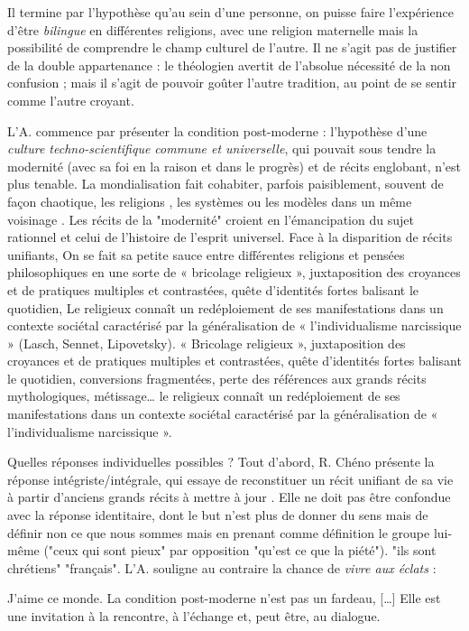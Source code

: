 Il termine par l'hypothèse qu'au sein d'une personne, on puisse faire l'expérience d'être \textit{bilingue} en différentes religions, avec une religion maternelle mais la possibilité de comprendre le champ culturel de l'autre.  Il ne s’agit pas de justifier de la double
appartenance : le théologien avertit de l’absolue nécessité de la non confusion ;
mais il s’agit de pouvoir goûter l’autre tradition, au point de se sentir comme
l’autre croyant. 

L'A. commence par présenter la condition post-moderne : l'hypothèse d'une \textit{culture techno-scientifique commune et universelle}, qui pouvait sous tendre la modernité (avec sa foi en la raison et dans le progrès) et de récits englobant, n'est plus tenable. La mondialisation fait cohabiter, parfois paisiblement, souvent de façon chaotique, les religions , les systèmes ou les modèles dans un même voisinage \cite[p. 10]{cheno_dieu_2017}. Les récits de la "modernité" croient en l'émancipation du sujet rationnel et celui de l'histoire de l'esprit universel. Face à la disparition de récits unifiants, On se fait sa petite sauce entre différentes religions et pensées philosophiques en une sorte de   « bricolage religieux », juxtaposition des croyances et de pratiques multiples et contrastées, quête d’identités fortes balisant le quotidien, Le religieux connaît un redéploiement de ses manifestations dans un contexte sociétal caractérisé par la généralisation de « l’individualisme narcissique » (Lasch, Sennet, Lipovetsky).  « Bricolage religieux », juxtaposition des croyances et de pratiques multiples et contrastées, quête d’identités fortes balisant le quotidien, conversions fragmentées, perte des références aux grands récits mythologiques, métissage… le religieux connaît un redéploiement de ses manifestations dans un contexte sociétal caractérisé par la généralisation de « l’individualisme narcissique ».  


Quelles réponses individuelles possibles ? Tout d'abord, R. Chéno présente la réponse intégriste/intégrale, qui essaye de reconstituer un récit unifiant de sa vie à partir d'anciens grands récits à mettre à jour \cite[p. 16]{cheno_dieu_2017}. Elle ne doit pas être confondue avec la réponse identitaire, dont le but n'est plus de donner du sens mais de définir non ce que nous sommes mais en prenant comme définition le groupe lui-même ("ceux qui sont pieux" par opposition "qu'est ce que la piété"). "ils sont chrétiens" "français".
L'A. souligne au contraire la chance de \textit{vivre aux éclats} :
\begin{singlequote}
  J'aime ce monde. La condition post-moderne n'est pas un fardeau, [\ldots]  
    Elle est une invitation à la rencontre, à l'échange et, peut être, au dialogue. \cite[p. 20]{cheno_dieu_2017}
\end{singlequote}

